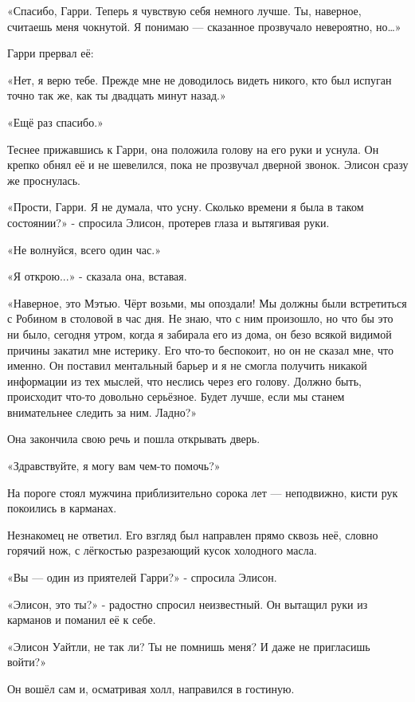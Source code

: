 \documentclass[a4paper,12pt]{book}
\begin{document}
\par
«Спасибо, Гарри. Теперь я чувствую себя немного лучше. Ты, наверное, считаешь меня чокнутой. Я понимаю — сказанное прозвучало невероятно, но…»
\par
Гарри прервал её:
\par
«Нет, я верю тебе. Прежде мне не доводилось видеть никого, кто был испуган точно так же, как ты двадцать минут назад.»
\par
«Ещё раз спасибо.»
\par
Теснее прижавшись к Гарри, она положила голову на его руки и уснула. Он крепко обнял её и не шевелился, пока не прозвучал дверной звонок. Элисон сразу же проснулась.
\par
«Прости, Гарри. Я не думала, что усну. Сколько времени я была в таком состоянии?» - спросила Элисон, протерев глаза и вытягивая руки.
\par
«Не волнуйся, всего один час.»
\par
«Я открою...» - сказала она, вставая.
\par
«Наверное, это Мэтью. Чёрт возьми, мы опоздали! Мы должны были встретиться с Робином в столовой в час дня. Не знаю, что с ним произошло, но что бы это ни было, сегодня утром, когда я забирала его из дома, он безо всякой видимой причины закатил мне истерику. Его что-то беспокоит, но он не сказал мне, что именно. Он поставил ментальный барьер и я не смогла получить никакой информации из тех мыслей, что неслись через его голову. Должно быть, происходит что-то довольно серьёзное. Будет лучше, если мы станем внимательнее следить за ним. Ладно?»
\par
Она закончила свою речь и пошла открывать дверь.\\
\par
«Здравствуйте, я могу вам чем-то помочь?»
\par
На пороге стоял мужчина приблизительно сорока лет — неподвижно, кисти рук покоились в карманах.
\par
Незнакомец не ответил. Его взгляд был направлен прямо сквозь неё, словно горячий нож, с лёгкостью разрезающий кусок холодного масла.
\par
«Вы — один из приятелей Гарри?» - спросила Элисон.
\par
«Элисон, это ты?» - радостно спросил неизвестный. Он вытащил руки из карманов и поманил её к себе.
\par
«Элисон Уайтли, не так ли? Ты не помнишь меня? И даже не пригласишь войти?»
\par
Он вошёл сам и, осматривая холл, направился в гостиную.
\end{document}
